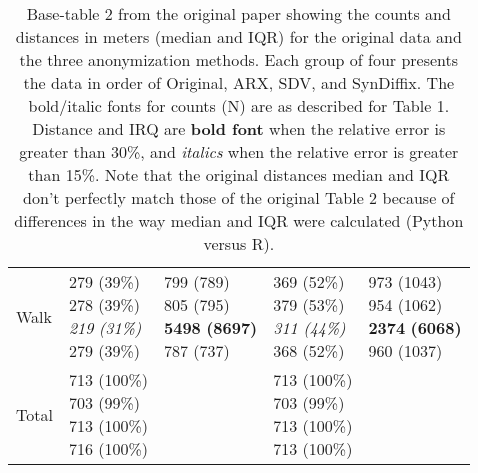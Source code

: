 \documentclass[10pt]{article}
\begin{document}
\begin{table}
\begin{center}
\begin{small}
\begin{tabular}{lllll}
Walk      &  \makecell[l]{\textnormal{279} \textnormal{(39\%)} \\\textnormal{278} \textnormal{(39\%)} \\\textit{219} \textit{(31\%)} \\\textnormal{279} \textnormal{(39\%)} \\}      &  \makecell[l]{\textnormal{799} \textnormal{(789)} \\\textnormal{805} \textnormal{(795)} \\\textbf{5498} \textbf{(8697)} \\\textnormal{787} \textnormal{(737)} \\}      &  \makecell[l]{\textnormal{369} \textnormal{(52\%)} \\\textnormal{379} \textnormal{(53\%)} \\\textit{311} \textit{(44\%)} \\\textnormal{368} \textnormal{(52\%)} \\}      &  \makecell[l]{\textnormal{973} \textnormal{(1043)} \\\textnormal{954} \textnormal{(1062)} \\\textbf{2374} \textbf{(6068)} \\\textnormal{960} \textnormal{(1037)} \\} \\ \cline{2-5}
      Total       & \makecell[l]{713 (100\%) \\703 (99\%) \\713 (100\%) \\716 (100\%) \\} &       & \makecell[l]{713 (100\%) \\703 (99\%) \\713 (100\%) \\713 (100\%) \\} & \\ 

      \bottomrule
      \end{tabular}
      \end{small}
      \caption{Base-table 2 from the original paper showing the counts and distances in meters (median and IQR) for the original data and the three anonymization methods. Each group of four presents the data in order of Original, ARX, SDV, and SynDiffix. The bold/italic fonts for counts (N) are as described for Table 1. Distance and IRQ are \textbf{bold font} when the relative error is greater than 30\%, and \textit{italics} when the relative error is greater than 15\%.  Note that the original distances median and IQR don't perfectly match those of the original Table 2 because of differences in the way median and IQR were calculated (Python versus R).}
      \label{tab:table2}
      \end{center}
      \end{table}
      \setlength{\fboxsep}{3pt}
    
\end{document}
